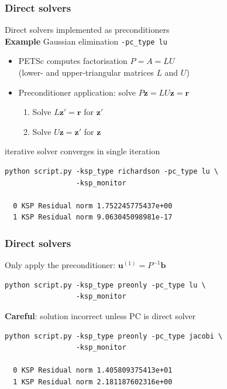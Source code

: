 \documentclass{beamer}
\begin{document}
\begin{frame}[fragile]
  \frametitle{Direct solvers}
  Direct solvers implemented as preconditioners\\
  \textbf{Example} Gaussian elimination \lstinline{-pc_type lu}
  \begin{itemize}
    \item PETSc computes factorisation $P=A=LU$\\
    {\footnotesize(lower- and upper-triangular matrices $L$ and $U$)}
    \item Preconditioner application: solve $P\boldsymbol{z}=LU\boldsymbol{z}=\boldsymbol{r}$
    \begin{enumerate}
      \item Solve $L\boldsymbol{z}'=\boldsymbol{r}$ for $\boldsymbol{z}'$
      \item Solve $U\boldsymbol{z}=\boldsymbol{z}'$ for $\boldsymbol{z}$
    \end{enumerate}
  \end{itemize}  
    iterative solver converges in single iteration
\begin{verbatim}
python script.py -ksp_type richardson -pc_type lu \
                 -ksp_monitor

  0 KSP Residual norm 1.752245775437e+00
  1 KSP Residual norm 9.063045098981e-17
\end{verbatim}
\end{frame}


\begin{frame}[fragile]
  \frametitle{Direct solvers}
Only apply the preconditioner: $\boldsymbol{u}^{(1)} = P^{-1}\boldsymbol{b}$
\begin{verbatim}
python script.py -ksp_type preonly -pc_type lu \
                 -ksp_monitor
\end{verbatim}
\textbf{Careful}: solution incorrect unless PC is direct solver
\begin{verbatim}
python script.py -ksp_type preonly -pc_type jacobi \
                 -ksp_monitor

  0 KSP Residual norm 1.405809375413e+01
  1 KSP Residual norm 2.181187602316e+00
\end{verbatim}
\end{frame}

\end{document}
